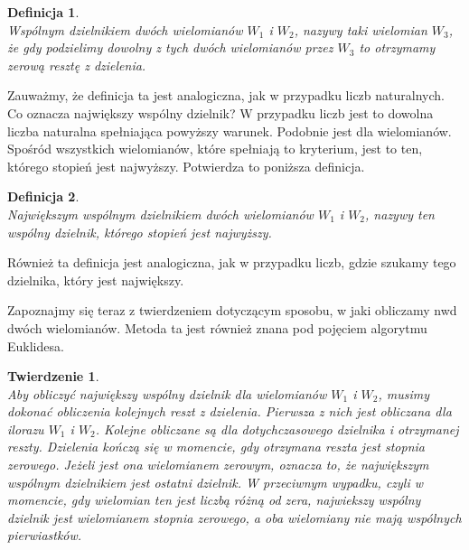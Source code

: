 \documentclass[twoside,a4paper]{book}
\newtheorem{theorem}{Twierdzenie}
\newtheorem{definition}{Definicja}
\begin{document}
\begin{definition}
	$ $\\
	Wspólnym dzielnikiem dwóch wielomianów $W_1$ i $W_2$, nazywy taki wielomian $W_3$, że gdy podzielimy dowolny z tych dwóch wielomianów przez $W_3$ to otrzymamy zerową resztę z dzielenia.
\end{definition}

Zauważmy, że definicja ta jest analogiczna, jak w przypadku liczb naturalnych.
Co oznacza największy wspólny dzielnik? W przypadku liczb jest to dowolna liczba naturalna spełniająca powyższy warunek. Podobnie jest dla wielomianów. Spośród wszystkich wielomianów, które spełniają to kryterium, jest to ten, którego stopień jest najwyższy. Potwierdza to poniższa definicja.

\begin{definition}
	$ $\\
	Największym wspólnym dzielnikiem dwóch wielomianów $W_1$ i $W_2$, nazywy ten wspólny dzielnik, którego stopień jest najwyższy.
\end{definition}

Również ta definicja jest analogiczna, jak w przypadku liczb, gdzie szukamy tego dzielnika, który jest największy.

Zapoznajmy się teraz z twierdzeniem dotyczącym sposobu, w jaki obliczamy nwd dwóch wielomianów. Metoda ta jest również znana pod pojęciem algorytmu Euklidesa.

\begin{theorem}
$ $\\
Aby obliczyć największy wspólny dzielnik dla wielomianów $W_1$ i $W_2$, musimy dokonać obliczenia kolejnych reszt z dzielenia. Pierwsza z nich jest obliczana dla ilorazu $W_1$ i $W_2$. Kolejne obliczane są dla dotychczasowego dzielnika i otrzymanej reszty. Dzielenia kończą się w momencie, gdy otrzymana reszta jest stopnia zerowego. Jeżeli jest ona wielomianem zerowym, oznacza to, że największym wspólnym dzielnikiem jest ostatni dzielnik. W przeciwnym wypadku, czyli w momencie, gdy wielomian ten jest liczbą różną od zera, najwiekszy wspólny dzielnik jest wielomianem stopnia zerowego, a oba wielomiany nie mają wspólnych pierwiastków. 
\end{theorem}
\end{document}
